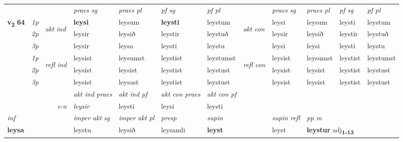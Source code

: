 \begin{longtable}[l]{X>{\footnotesize\itshape}llXXXXlXXXX}
\midrule

 & &   & \textit{praes sg}  & \textit{praes pl}    & \textit{ pf sg} & \textit{pf pl} & & \textit{praes sg}  & \textit{praes pl}    & \textit{pf sg} & \textit{pf pl }  \\ \cmidrule{4-7} \cmidrule{9-12}
 \multirow{2}{*}{{{\textbf{v{\textsubscript{2}}} \Large{\textbf{64}}}}}  & 1p & \multirow{3}{*}{\begin{turn}{90}\textit{akt ind}\end{turn}} & \textbf{leysi} & leysum & \textbf{leysti} & leystum & \multirow{3}{*}{\begin{turn}{90}\textit{akt con}\end{turn}} &leysi & leysum & leysti & leystum\\*
 & 2p &  &  leysir  & leysið & leystir & leystuð & & leysir & leysið & leystir & leystuð \\*
 & 3p &  & leysir & leysa & leysti & leystu & & leysi & leysi& leysti & leystu \\*
\cmidrule{4-7} \cmidrule{9-12}
 & 1p & \multirow{3}{*}{\begin{turn}{90}\textit{refl ind}\end{turn}}  & leysist & leysumst & leystist & leystumst & \multirow{3}{*}{\begin{turn}{90}\textit{refl con}\end{turn}}  &leysist & leysumst & leystist & leystumst \\*
 & 2p &  & leysist & leysist & leystist & leystust & &leysist & leysist & leystist & leystust \\*
 & 3p  & & leysist & leysast & leystist & leystust & & leysist & leysist& leystist & leystust \\*
\cmidrule{4-7} \cmidrule{9-12}

   && &  \textit{akt ind praes} & \textit{akt ind pf} & \textit{akt con praes} & \textit{akt con pf} \\*
\multicolumn{3}{r}{\textit{e-n}} & leysir & leysti & leysi & leysti \\*

\cmidrule{4-7}
   {\textit{inf}} & &  & \textit{imper akt sg} & \textit{imper akt pl}   & \textit{presp} & \textit{supin} && \textit{supin refl} & \textit{pp m} \\*
  {\textbf{leysa}} & && leystu  & leysið   & leysandi &  \textbf{leyst} && leyst & \multicolumn{2}{l}{\textbf{leystur} adj\textbf{\textsubscript{1-13}}} \\*

\midrule


\end{longtable}
